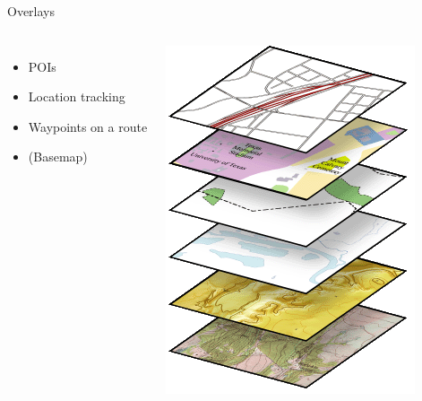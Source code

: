 \documentclass{beamer}
\begin{document}
\begin{frame}{Overlays}
 \begin{columns}
   \begin{itemize}
    \item POIs
    \item Location tracking
    \item Waypoints on a route
    \item (Basemap)
   \end{itemize}
   \includegraphics[scale=0.5]{basemap_layers}
 \end{columns}
\end{frame}
\end{document}
